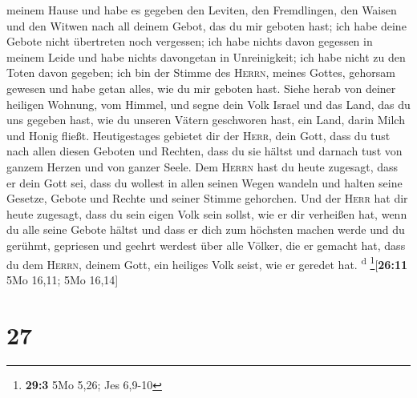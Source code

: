 meinem Hause und habe es gegeben den Leviten, den Fremdlingen, den
Waisen und den Witwen nach all deinem Gebot, das du mir geboten hast;
ich habe deine Gebote nicht übertreten noch vergessen; 
ich habe nichts davon gegessen in meinem Leide und habe nichts
davongetan in Unreinigkeit; ich habe nicht zu den Toten davon gegeben;
ich bin der Stimme des \textsc{Herrn}, meines Gottes, gehorsam gewesen
und habe getan alles, wie du mir geboten hast.  Siehe
herab von deiner heiligen Wohnung, vom Himmel, und segne dein Volk
Israel und das Land, das du uns gegeben hast, wie du unseren Vätern
geschworen hast, ein Land, darin Milch und Honig fließt. 
Heutigestages gebietet dir der \textsc{Herr}, dein Gott, dass du tust
nach allen diesen Geboten und Rechten, dass du sie hältst und darnach
tust von ganzem Herzen und von ganzer Seele.  Dem
\textsc{Herrn} hast du heute zugesagt, dass er dein Gott sei, dass du
wollest in allen seinen Wegen wandeln und halten seine Gesetze, Gebote
und Rechte und seiner Stimme gehorchen.  Und der
\textsc{Herr} hat dir heute zugesagt, dass du sein eigen Volk sein
sollst, wie er dir verheißen hat, wenn du alle seine Gebote hältst
 und dass er dich zum höchsten machen werde und du
gerühmt, gepriesen und geehrt werdest über alle Völker, die er gemacht
hat, dass du dem \textsc{Herrn}, deinem Gott, ein heiliges Volk seist,
wie er geredet hat. \textsuperscript{d} \footnote{\textbf{29:3} 5Mo
  5,26; Jes 6,9-10}{[}\textbf{26:11} 5Mo 16,11; 5Mo 16,14{]}

\hypertarget{section-26}{%
\section{27}\label{section-26}}

